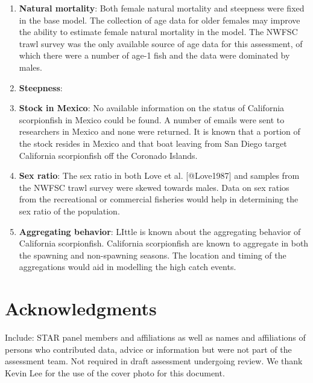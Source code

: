 \documentclass[12pt,]{article}
\begin{document}
\begin{enumerate}

\item \textbf{Natural mortality}: Both female natural mortality and steepness were 
fixed in the base model.  The collection of age data for older females may improve 
the ability to estimate female natural mortality in the model.  The NWFSC trawl survey
was the only available source of age data for this assessment, of which there were a 
number of age-1 fish and the data were dominated by males.

\item \textbf{Steepness}: 

\item \textbf{Stock in Mexico}:  No available information on the status of California 
scorpionfish in Mexico could be found.  A number of emails were sent to researchers 
in Mexico and none were returned.  It is known that a portion of the stock resides 
in Mexico and that boat leaving from San Diego target California scorpionfish off 
the Coronado Islands.  


\item \textbf{Sex ratio}:  The sex ratio in both Love et al. [@Love1987] and samples 
from the NWFSC trawl survey were skewed towards males. Data on sex ratios from the 
recreational or commercial fisheries would help in determining the sex ratio of the population.

\item \textbf{Aggregating behavior}: LIttle is known about the aggregating behavior
of California scorpionfish.  California scorpionfish are known to aggregate in both
the spawning and non-spawning seasons.  The location and timing of the aggregations
would aid in modelling the high catch events.

\end{enumerate}

\section{Acknowledgments}\label{acknowledgments}

Include: STAR panel members and affiliations as well as names and
affiliations of persons who contributed data, advice or information but
were not part of the assessment team. Not required in draft assessment
undergoing review. We thank Kevin Lee for the use of the cover photo for
this document.

\newpage

\FloatBarrier
\end{document}
